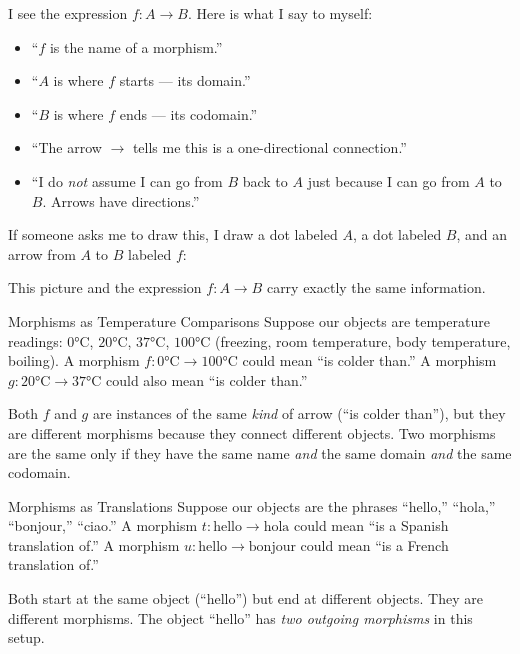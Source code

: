 \begin{dialog}
I see the expression $f : A \to B$. Here is what I say to myself:
\begin{itemize}
  \item ``$f$ is the name of a morphism.''
  \item ``$A$ is where $f$ starts --- its domain.''
  \item ``$B$ is where $f$ ends --- its codomain.''
  \item ``The arrow $\to$ tells me this is a one-directional connection.''
  \item ``I do \emph{not} assume I can go from $B$ back to $A$ just because
        I can go from $A$ to $B$. Arrows have directions.''
\end{itemize}
If someone asks me to draw this, I draw a dot labeled $A$, a dot labeled $B$,
and an arrow from $A$ to $B$ labeled $f$:
\medskip
\begin{center}
\end{center}
\medskip
This picture and the expression $f : A \to B$ carry exactly the same
information.
\end{dialog}

\begin{example}{Morphisms as Temperature Comparisons}
Suppose our objects are temperature readings: $0°\text{C}$, $20°\text{C}$,
$37°\text{C}$, $100°\text{C}$ (freezing, room temperature, body temperature,
boiling). A morphism $f : 0°\text{C} \to 100°\text{C}$ could mean ``is colder
than.'' A morphism $g : 20°\text{C} \to 37°\text{C}$ could also mean ``is
colder than.''

Both $f$ and $g$ are instances of the same \emph{kind} of arrow (``is colder
than''), but they are different morphisms because they connect different
objects. Two morphisms are the same only if they have the same name \emph{and}
the same domain \emph{and} the same codomain.
\end{example}

\begin{example}{Morphisms as Translations}
Suppose our objects are the phrases ``hello,'' ``hola,'' ``bonjour,'' ``ciao.''
A morphism $t : \text{hello} \to \text{hola}$ could mean ``is a Spanish
translation of.'' A morphism $u : \text{hello} \to \text{bonjour}$ could mean
``is a French translation of.''

Both start at the same object (``hello'') but end at different objects. They
are different morphisms. The object ``hello'' has \emph{two outgoing morphisms}
in this setup.
\end{example}

